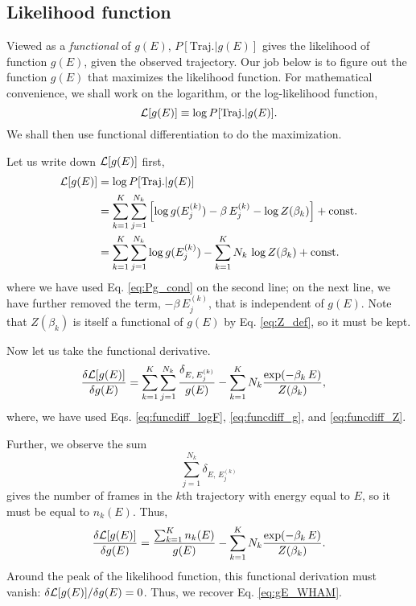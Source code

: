 \documentclass[aip,jcp,preprint,superscriptaddress]{revtex4-1}
\begin{document}
\subsection{Likelihood function}



Viewed as a \emph{functional} of $g(E)$,
$P[\mathrm{Traj.}|g(E)]$
gives the likelihood of function $g(E)$,
given the observed trajectory.
%
Our job below is to figure out the function $g(E)$
that maximizes the likelihood function.
%
For mathematical convenience,
we shall work on the logarithm,
or the log-likelihood function,
\[
  \mathcal{L}[g(E)]
  \equiv
  \log P[\mathrm{Traj.}|g(E)].
\]
%
We shall then use functional differentiation
to do the maximization.
%





Let us write down $\mathcal{L}[g(E)]$ first,
%
\begin{align}
\mathcal{L}[g(E)]
&=
\log P[\mathrm{Traj.} | g(E)]
\notag \\
&=
\sum_{k = 1}^K
\sum_{j = 1}^{N_k}
  \left[
  \log g( E^{(k)}_j )
  -\beta \, E^{(k)}_j
  - \log Z(\beta_k)
\right]
+\mathrm{const.}
\notag \\
&=
\sum_{k = 1}^K
\sum_{j = 1}^{N_k}
\log g( E^{(k)}_j )
-
\sum_{k = 1}^K
N_k \,
\log Z(\beta_k)
+\mathrm{const.}
\end{align}
where
we have used Eq. \eqref{eq:Pg_cond}
on the second line;
on the next line,
we have further removed
the term, $-\beta \, E^{(k)}_j$,
that is independent of $g(E)$.
%
Note that
$Z(\beta_k)$ is
itself a functional of $g(E)$
by Eq. \eqref{eq:Z_def},
so it must be kept.


Now let us take the functional derivative.
%
\begin{align}
\frac{ \delta \mathcal{L}[g(E)] }
     { \delta g(E) }
&=
\sum_{k = 1}^K
\sum_{j = 1}^{N_k}
\frac{ \delta_{E, \, E^{(k)}_j} }
     { g( E ) }
-
\sum_{k = 1}^K
N_k
\frac{ \exp(-\beta_k \, E) }
     { Z(\beta_k) },
\end{align}
where,
we have used Eqs.
\eqref{eq:funcdiff_logF},
\eqref{eq:funcdiff_g},
and
\eqref{eq:funcdiff_Z}.




Further,
we observe the sum
\[
  \sum_{j = 1}^{N_k} \delta_{E, \, E^{(k)}_j}
\]
gives the number of frames in the $k$th trajectory
with energy equal to $E$,
so it must be equal to $n_k(E)$.
%
Thus,
\begin{align}
\frac{ \delta \mathcal{L}[g(E)] }
     { \delta g(E) }
=
\frac{  \sum_{k = 1}^K n_k(E) }
     { g( E ) }
-
\sum_{k = 1}^K
N_k
\frac{ \exp(-\beta_k \, E) }
     { Z(\beta_k) }.
\end{align}
%
Around the peak of the likelihood function,
this functional derivation must vanish:
$\delta \mathcal{L}[g(E)]/ \delta g(E) = 0$.
%
Thus,
we recover Eq. \eqref{eq:gE_WHAM}.
\end{document}
